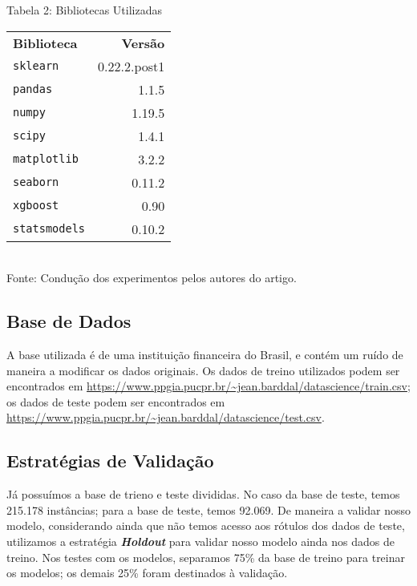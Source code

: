 Tabela 2: Bibliotecas Utilizadas
\begin{center}
\begin{tabular}{lr}

    \Xhline{2.5\arrayrulewidth}
    \textbf{Biblioteca} & \textbf{Versão} \\
    \Xhline{2.5\arrayrulewidth}

    \texttt{\footnotesize{sklearn}} &  \small{0.22.2.post1} \\
    \hline
    \texttt{\footnotesize{pandas}} &  \small{1.1.5} \\
    \hline
    \texttt{\footnotesize{numpy}} &  \small{1.19.5} \\
    \hline
    \texttt{\footnotesize{scipy}} &  \small{1.4.1} \\
    \texttt{\footnotesize{matplotlib}} &  \small{3.2.2} \\
    \hline
    \texttt{\footnotesize{seaborn}} &  \small{0.11.2} \\
    \hline
    \texttt{\footnotesize{xgboost}} &  \small{0.90} \\
    \hline
    \texttt{\footnotesize{statsmodels}} &  \small{0.10.2} \\

\end{tabular}
\\ Fonte: Condução dos experimentos pelos autores do artigo.
\end{center}

\subsection{Base de Dados}

A base utilizada é de uma instituição financeira do Brasil, e contém um ruído de maneira a modificar os dados originais. Os dados de treino utilizados podem ser encontrados em \url{https://www.ppgia.pucpr.br/~jean.barddal/datascience/train.csv}; os dados de teste podem ser encontrados em \url{https://www.ppgia.pucpr.br/~jean.barddal/datascience/test.csv}.

\subsection{Estratégias de Validação}

Já possuímos a base de trieno e teste divididas. No caso da base de teste, temos 215.178 instâncias; para a base de teste, temos 92.069. De maneira a validar nosso modelo, considerando ainda que não temos acesso aos rótulos dos dados de teste, utilizamos a estratégia \textit{\textbf{Holdout}} para validar nosso modelo ainda nos dados de treino. Nos testes com os modelos, separamos 75\% da base de treino para treinar os modelos; os demais 25\% foram destinados à validação.